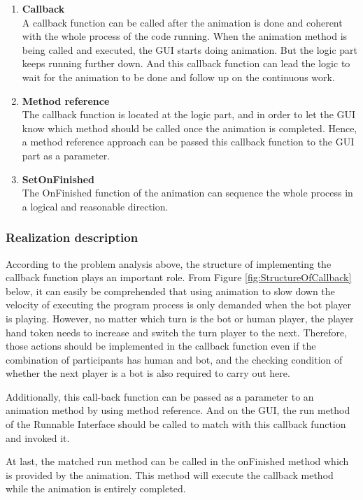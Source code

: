 \begin{enumerate}
	\item\textbf{Callback}\\
A callback function can be called after the animation is done and coherent with the whole process of the code running. When the animation method is being called and executed, the GUI starts doing animation. But the logic part keeps running further down. And this callback function can lead the logic to wait for the animation to be done and follow up on the continuous work. 

	\item\textbf{Method reference}\\
The callback function is located at the logic part, and in order to let the GUI know which method should be called once the animation is completed. Hence, a method reference approach can be passed this callback function to the GUI part as a parameter.    
 
	\item\textbf{SetOnFinished}\\
The OnFinished function of the animation can sequence the whole process in a logical and reasonable direction. 
	

\end{enumerate}

\newpage
\subsubsection{Realization description}
According to the problem analysis above, the structure of implementing the callback function plays an important role. From Figure \ref{fig:StructureOfCallback} below, it can easily be comprehended that using animation to slow down the velocity of executing the program process is only demanded when the bot player is playing. However, no matter which turn is the bot or human player, the player hand token needs to increase and switch the turn player to the next. Therefore, those actions should be implemented in the callback function even if the combination of participants has human and bot, and the checking condition of whether the next player is a bot is also required to carry out here.   

Additionally, this call-back function can be passed as a parameter to an animation method by using method reference. And on the GUI, the run method of the Runnable Interface should be called to match with this callback function and invoked it. 

At last, the matched run method can be called in the onFinished method which is provided by the animation. This method will execute the callback method while the animation is entirely completed. 


